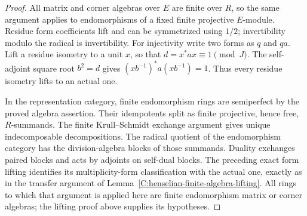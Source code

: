 \begin{proof}
All matrix and corner algebras
over $E$ are finite over $R$,
so the same argument applies
to endomorphisms of a fixed
finite projective $E$-module.
Residue form coefficients lift
and can be symmetrized using
$1/2$; invertibility modulo
the radical is invertibility.
For injectivity write two
forms as $q$ and $q a$.
Lift a residue isometry to
a unit $x$, so that
$d=x^*ax\equiv1\pmod J$.
The self-adjoint square root
$b^2=d$ gives
$(xb^{-1})^*a(xb^{-1})=1$.
Thus every residue isometry
lifts to an actual one.

In the representation category,
finite endomorphism rings are
semiperfect by the proved
algebra assertion.  Their
idempotents split as finite
projective, hence free,
$R$-summands.  The finite
Krull--Schmidt exchange
argument gives unique
indecomposable decompositions.
The radical quotient of
the endomorphism category
has the division-algebra
blocks of those summands.
Duality exchanges paired
blocks and acts by adjoints
on self-dual blocks.
The preceding exact form
lifting identifies its
multiplicity-form classification
with the actual one, exactly
as in the transfer argument
of Lemma~\ref{C:henselian-finite-algebra-lifting}.
All rings to which that
argument is applied here
are finite endomorphism
matrix or corner algebras;
the lifting proof above
supplies its hypotheses.
\end{proof}

